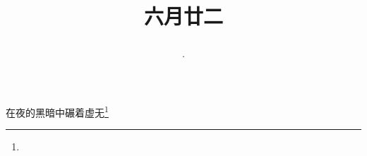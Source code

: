 \title{\date[d=27,m=7,y=2024][year:cn-y,年,month:cn,day:cn,日,·,weekday]·六月廿二 }
在夜的黑暗中碾着虚无\footnote{ }

